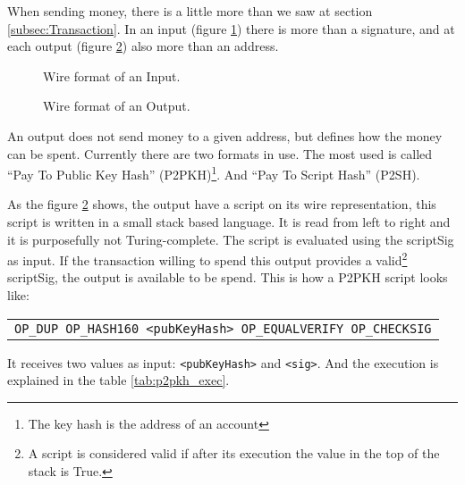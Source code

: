 When sending money, there is a little more than we saw at section
  \ref{subsec:Transaction}. In an input (figure \ref{fig:input}) there is more
  than a signature, and at each output (figure \ref{fig:output}) also more than
  an address.

  \begin{figure}[ht]
	\centering
	
	\caption{Wire format of an Input.}
	\label{fig:input}
\end{figure}

\begin{figure}[ht]
	\centering
	
	\caption{Wire format of an Output.}
	\label{fig:output}
\end{figure}

An output does not send money to a given address, but defines how the money can
  be spent. Currently there are two formats in use. The most used is called
  ``Pay To Public Key Hash'' (P2PKH)\footnote{The key hash is the address of an
  account}. And ``Pay To Script Hash'' (P2SH).

As the figure \ref{fig:output} shows, the output have a script on its wire
  representation, this script is written in a small stack based language.
It is read from left to right and it is purposefully not Turing-complete.
The script is evaluated using the scriptSig as input. If the transaction willing
  to spend this output provides a valid\footnote{A script is considered valid
  if after its execution the value in the top of the stack is True.} scriptSig,
  the output is available to be spend. This is how a P2PKH script looks like:

\begin{center}
	  \begin{tabular}{|c|}
		  \texttt{OP\_DUP OP\_HASH160 <pubKeyHash> OP\_EQUALVERIFY OP\_CHECKSIG}
     \end{tabular}
\end{center}

  It receives two values as input:  \lstinline{<pubKeyHash>} and
  \lstinline{<sig>}. And the execution is explained in the table \ref{tab:p2pkh_exec}.

